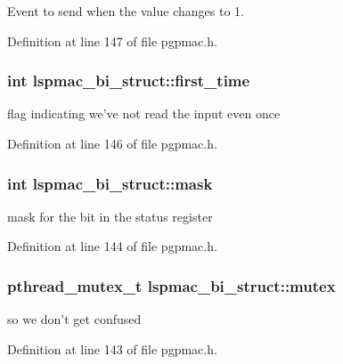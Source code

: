 Event to send when the value changes to 1. 



Definition at line 147 of file pgpmac.\-h.

\hypertarget{structlspmac__bi__struct_a814978c33dc99e7911faa4ddb12bfd90}{
\subsubsection[{first\-\_\-time}]{\setlength{\rightskip}{0pt plus 5cm}int lspmac\-\_\-bi\-\_\-struct\-::first\-\_\-time}}\label{structlspmac__bi__struct_a814978c33dc99e7911faa4ddb12bfd90}


flag indicating we've not read the input even once 



Definition at line 146 of file pgpmac.\-h.

\hypertarget{structlspmac__bi__struct_ac010058c9883088705059dee1d90ee72}{
\subsubsection[{mask}]{\setlength{\rightskip}{0pt plus 5cm}int lspmac\-\_\-bi\-\_\-struct\-::mask}}\label{structlspmac__bi__struct_ac010058c9883088705059dee1d90ee72}


mask for the bit in the status register 



Definition at line 144 of file pgpmac.\-h.

\hypertarget{structlspmac__bi__struct_a58053a98fa4696b56d674e775b3b4690}{
\subsubsection[{mutex}]{\setlength{\rightskip}{0pt plus 5cm}pthread\-\_\-mutex\-\_\-t lspmac\-\_\-bi\-\_\-struct\-::mutex}}\label{structlspmac__bi__struct_a58053a98fa4696b56d674e775b3b4690}


so we don't get confused 



Definition at line 143 of file pgpmac.\-h.

